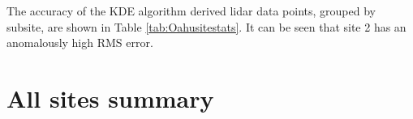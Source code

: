 The accuracy of the KDE algorithm derived lidar data points, grouped by subsite, are shown in Table \ref{tab:Oahusitestats}. It can be seen that site 2 has an anomalously high RMS error.  





\section{All sites summary}




% 

